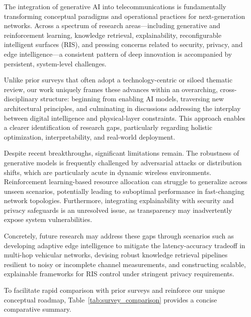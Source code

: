 \documentclass[sigconf]{acmart}
\begin{document}
The integration of generative AI into telecommunications is fundamentally transforming conceptual paradigms and operational practices for next-generation networks. Across a spectrum of research areas—including generative and reinforcement learning, knowledge retrieval, explainability, reconfigurable intelligent surfaces (RIS), and pressing concerns related to security, privacy, and edge intelligence—a consistent pattern of deep innovation is accompanied by persistent, system-level challenges.

Unlike prior surveys that often adopt a technology-centric or siloed thematic review, our work uniquely frames these advances within an overarching, cross-disciplinary structure: beginning from enabling AI models, traversing new architectural principles, and culminating in discussions addressing the interplay between digital intelligence and physical-layer constraints. This approach enables a clearer identification of research gaps, particularly regarding holistic optimization, interpretability, and real-world deployment.

Despite recent breakthroughs, significant limitations remain. The robustness of generative models is frequently challenged by adversarial attacks or distribution shifts, which are particularly acute in dynamic wireless environments. Reinforcement learning-based resource allocation can struggle to generalize across unseen scenarios, potentially leading to suboptimal performance in fast-changing network topologies. Furthermore, integrating explainability with security and privacy safeguards is an unresolved issue, as transparency may inadvertently expose system vulnerabilities.

Concretely, future research may address these gaps through scenarios such as developing adaptive edge intelligence to mitigate the latency-accuracy tradeoff in multi-hop vehicular networks, devising robust knowledge retrieval pipelines resilient to noisy or incomplete channel measurements, and constructing scalable, explainable frameworks for RIS control under stringent privacy requirements.

To facilitate rapid comparison with prior surveys and reinforce our unique conceptual roadmap, Table~\ref{tab:survey_comparison} provides a concise comparative summary.
\end{document}
